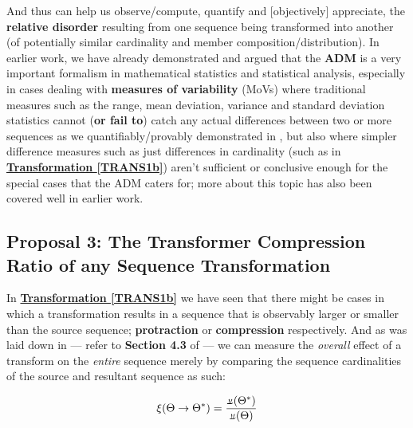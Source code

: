 \documentclass[a4paper, 18pt]{book} %
\newcommand{\invpi}{\rotatebox[origin=c]{180}{$\pi$}}
\begin{document}
And thus can help us observe/compute, quantify and [objectively] appreciate, the \textbf{relative disorder} resulting from one sequence being transformed into another (of potentially similar cardinality and member composition/distribution). In earlier work, we have already demonstrated and argued that the \textbf{ADM} is a very important formalism in mathematical statistics and statistical analysis, especially in cases dealing with \textbf{measures of variability} (MoVs) where traditional measures such as the range, mean deviation, variance and standard deviation statistics cannot (\textbf{or fail to}) catch any actual differences between two or more sequences as we quantifiably/provably demonstrated in \cite{transformatics}, but also where simpler difference measures such as just differences in cardinality (such as in \textbf{\hyperref[TRANS1b]{Transformation \ref{TRANS1b}}}) aren't sufficient or conclusive enough for the special cases that the ADM caters for; more about this topic has also been covered well in earlier work\cite{lutalo_2025_trans_genetics}.


\subsection{Proposal 3: The Transformer Compression Ratio of any Sequence Transformation\cite{transformatics}}
\label{PROP3}

In  \textbf{\hyperref[TRANS1b]{Transformation \ref{TRANS1b}}} we have seen that there might be cases in which a transformation results in a sequence that is observably larger or smaller than the source sequence; \textbf{protraction} or \textbf{compression} respectively. And as was laid down in \cite{transformatics} --- refer to \textbf{Section 4.3} of \cite{transformatics} --- we can measure the \textit{overall} effect of a transform on the \textit{entire} sequence merely by comparing the sequence cardinalities of the source and resultant sequence as such:

\vspace{1em}
\begin{equation}
\label{EQTCRb}
\xi(\Theta \rightarrow \Theta^*) = \frac{\invpi(\Theta^*)}{\invpi(\Theta)}
\end{equation}
\vspace{1em}
\end{document}

